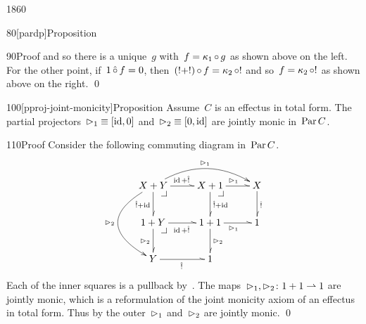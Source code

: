 \begin{parsec}{1860}
\begin{point}{80}[pardp]{Proposition}
\begin{point}{90}{Proof}
    and so there is a unique~$g$ with~$f = \kappa_1 \mathop{\circ} g$
    as shown above on the left.
For the other point, if~$1 \mathop{\hat\circ} f = 0$,
    then~$(!+!)\mathop{\circ} f = \kappa_2 \mathop{\circ} !$
    and so~$f = \kappa_2 \mathop{\circ} !$ as shown above on the right. \qed
\end{point}
\end{point}
\begin{point}{100}[pproj-joint-monicity]{Proposition}%
    Assume~$C$ is an effectus in total form.
    The partial projectors~$\mathord{\vartriangleright}_1 \equiv [\operatorname{id},0]$
        and~$\mathord{\vartriangleright}_2 \equiv [0, \operatorname{id}]$
        are jointly monic in~$\operatorname{Par} C$.
\begin{point}{110}{Proof}%
Consider the following commuting diagram in~$\operatorname{Par} C$.
\begin{equation*}
\xymatrix {
    X+Y \pullback
    \ar@/^1.5pc/[rr]^{\pproj_1}
    \ar@/_3pc/[dd]_{\pproj_2}
        \ar@^{>}[r]^{\id+\hat!}
        \ar@^{>}[d]_{\hat! + \id}
& X+1 \pullback
        \ar@^{>}[r]^{\pproj_1}
        \ar@^{>}[d]^{\hat! + \id}
& X
        \ar@^{>}[d]^{\hat!}
\\ 1+Y \pullback
        \ar@^{>}[r]_{\id+\hat!}
        \ar@^{>}[d]_{\pproj_2}
& 1+1
        \ar@^{>}[r]_{\pproj_1}
        \ar@^{>}[d]^{\pproj_2}
& 1
\\ Y
        \ar@^{>}[r]_{\hat!}
& 1
}
\end{equation*}
Each of the inner squares is a pullback by~.
The maps~$\mathord{\vartriangleright}_1,\mathord{\vartriangleright}_2\colon 1 + 1 \rightharpoonup 1$
    are jointly monic,
    which is a reformulation
    of the joint monicity axiom of an effectus in total form.
Thus by 
    the outer~$\mathord{\vartriangleright}_1$ and~$\mathord{\vartriangleright}_2$ are jointly monic. \qed
\end{point}
\end{point}
\end{parsec}

